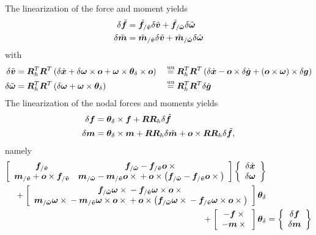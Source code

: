 The linearization of the force and moment yields
\begin{subequations}
\begin{align}
	\delta\tilde{\bm{f}}
	&=
	\tilde{\bm{f}}_{/\tilde{\bm{v}}}
	\delta\tilde{\bm{v}}
	+ 
	\tilde{\bm{f}}_{/\tilde{\bm{\omega}}}
	\delta\tilde{\bm{\omega}}
	\\
	\delta\tilde{\bm{m}}
	&=
	\tilde{\bm{m}}_{/\tilde{\bm{v}}}
	\delta\tilde{\bm{v}}
	+ 
	\tilde{\bm{m}}_{/\tilde{\bm{\omega}}}
	\delta\tilde{\bm{\omega}}
\end{align}
\end{subequations}
with
\begin{subequations}
\begin{align}
	\delta\tilde{\bm{v}}
	&=
	\bm{R}_h^T \bm{R}^T \left( 
		\delta\dot{\bm{x}}
		+ \delta\bm{\omega} \times \bm{o}
		+ \bm{\omega} \times \bm{\theta}_\delta \times \bm{o}
	 \right)
	&&\overset{\text{uu}}{=}
	\bm{R}_h^T \bm{R}^T \left( 
		\delta\dot{\bm{x}}
		- \bm{o} \times \delta\dot{\bm{g}}
		+ \left( \bm{o} \times \bm{\omega} \right) \times \delta\bm{g}
	 \right)
	\\
	\delta\tilde{\bm{\omega}}
	&=
	\bm{R}_h^T \bm{R}^T \left( 
		\delta\bm{\omega}
		+ \bm{\omega} \times \bm{\theta}_\delta
	 \right)
	&&\overset{\text{uu}}{=}
	\bm{R}_h^T \bm{R}^T \delta\dot{\bm{g}}
\end{align}
\end{subequations}
The linearization of the nodal forces and moments yields
\begin{subequations}
\begin{align}
	\delta\bm{f}
	&=
	\bm{\theta}_\delta \times \bm{f}
	+ \bm{R} \bm{R}_h \delta\tilde{\bm{f}}
	\\
	\delta\bm{m}
	&=
	\bm{\theta}_\delta \times \bm{m}
	+ \bm{R} \bm{R}_h \delta\tilde{\bm{m}}
	+ \bm{o} \times \bm{R} \bm{R}_h \delta\tilde{\bm{f}}
	,
\end{align}
\end{subequations}
namely
\begin{align}
	\sqbr{\matr{cc}{
		\T{f}_{/\tilde{\T{v}}}
			& \T{f}_{/\tilde{\T{\omega}}}
			- \T{f}_{/\tilde{\T{v}}}\T{o}\times{}
		\\
%
		\T{m}_{/\tilde{\T{v}}}
		+ \T{o}\times\T{f}_{/\tilde{\T{v}}}
			& \T{m}_{/\tilde{\T{\omega}}}
			- \T{m}_{/\tilde{\T{v}}}\T{o}\times{}
			+ \T{o}\times\plbr{
				\T{f}_{/\tilde{\T{\omega}}}
				- \T{f}_{/\tilde{\T{v}}}\T{o}\times{}
			}
	}} \cubr{\cvvect{
		\delta\dot{\T{x}} \\
		\delta\T{\omega}
	}}
	& \nonumber \\ \mbox{}
	+ \sqbr{\matr{c}{
		\T{f}_{/\tilde{\T{\omega}}} \T{\omega}\times{}
		- \T{f}_{/\tilde{\T{v}}}\T{\omega}\times\T{o}\times{}
		\\
%
		\T{m}_{/\tilde{\T{\omega}}} \T{\omega}\times{}
		- \T{m}_{/\tilde{\T{v}}}\T{\omega}\times\T{o}\times{}
		+ \T{o}\times\plbr{
			\T{f}_{/\tilde{\T{\omega}}} \T{\omega}\times{}
			- \T{f}_{/\tilde{\T{v}}}\T{\omega}\times\T{o}\times{}
		}
	}} \T{\theta}_\delta
	& \nonumber \\ \mbox{}
	+ \sqbr{\matr{c}{
		-\T{f} \times{}
		\\
%
		-\T{m}\times{}
	}} \T{\theta}_\delta
	&=
	\cubr{\cvvect{
		\delta\T{f} \\
		\delta\T{m}
	}}
\end{align}
